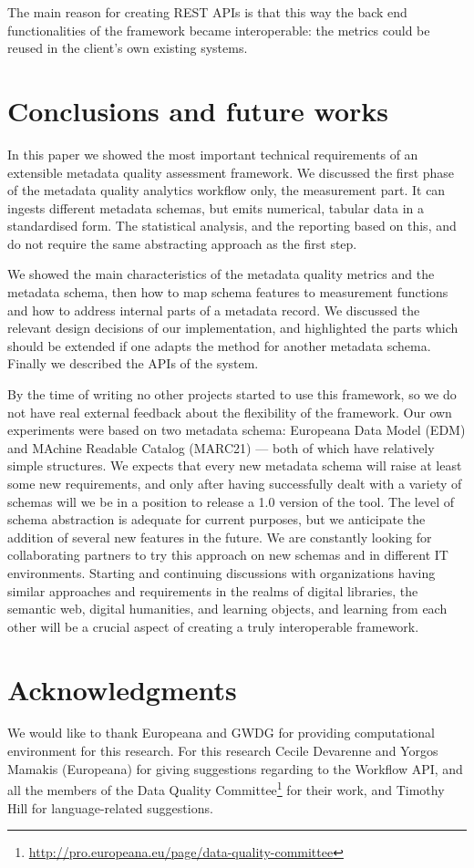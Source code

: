 The main reason for creating REST APIs is that this way the back end functionalities of the framework became interoperable: the metrics could be reused in the client's own existing systems.

\section{Conclusions and future works}

In this paper we showed the most important technical requirements of an extensible metadata quality assessment framework. We discussed the first phase of the metadata quality analytics workflow only, the measurement part. It can ingests different metadata schemas, but emits numerical, tabular data in a standardised form. The statistical analysis, and the reporting based on this, and do not require the same abstracting approach as the first step.

We showed the main characteristics of the metadata quality metrics and the metadata schema, then how to map schema features to measurement functions and how to address internal parts of a metadata record. We discussed the relevant design decisions of our implementation, and highlighted the parts which should be extended if one adapts the method for another metadata schema. Finally we described the APIs of the system.

By the time of writing no other projects started to use this framework, so we do not have real external feedback about the flexibility of the framework. Our own experiments were based on two metadata schema: Europeana Data Model (EDM) and MAchine Readable Catalog (MARC21) --- both of which have relatively simple structures. We expects that every new metadata schema will raise at least some new requirements, and only after having successfully dealt with a variety of schemas will we be in a position to release a 1.0 version of the tool. The level of schema abstraction is adequate for current purposes, but we anticipate the addition of several new features in the future. We are constantly looking for collaborating partners to try this approach on new schemas and in different IT environments. Starting and continuing discussions with organizations having similar approaches and requirements in the realms of digital libraries, the semantic web, digital humanities, and learning objects, and learning from each other will be a crucial aspect of creating a truly interoperable framework.

\section{Acknowledgments}
We would like to thank Europeana and GWDG for providing computational environment for this research. For this research Cecile Devarenne and Yorgos Mamakis (Europeana) for giving suggestions regarding to the Workflow API, and all the members of the Data Quality Committee\footnote{\url{http://pro.europeana.eu/page/data-quality-committee}} for their work, and Timothy Hill for language-related suggestions.

% 
% 
